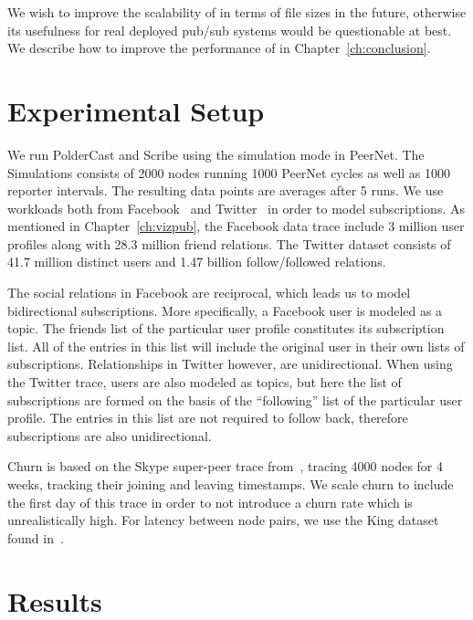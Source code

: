 We wish to improve the scalability of \demo{} in terms of file sizes in
the future, otherwise its usefulness for real deployed pub/sub systems
would be questionable at best. We describe how to improve the
performance of \demo{} in Chapter~\ref{ch:conclusion}.

\section{Experimental Setup}

We run PolderCast and Scribe using the simulation mode in PeerNet. The
Simulations consists of 2000 nodes running 1000 PeerNet cycles as well
as 1000 reporter intervals. The resulting data points are averages after 5
runs. We use workloads both from Facebook~\cite{facebook-eurosys09} and
Twitter~\cite{Kwak10www} in order to model subscriptions. As mentioned
in Chapter~\ref{ch:vizpub}, the Facebook data trace include 3 million
user profiles along with 28.3 million friend relations. The Twitter
dataset consists of 41.7 million distinct users and 1.47 billion
follow/followed relations.

The social relations in Facebook are reciprocal, which leads us to model
bidirectional subscriptions. More specifically, a Facebook user is
modeled as a topic. The friends list of the particular user profile
constitutes its subscription list. All of the entries in this list will
include the original user in their own lists of subscriptions.
Relationships in Twitter however, are unidirectional. When using the
Twitter trace, users are also modeled as topics, but here the list of
subscriptions are formed on the basis of the ``following'' list of the
particular  user profile. The entries in this list are not required to
follow back, therefore subscriptions are also unidirectional.

Churn is based on the Skype super-peer trace from~\cite{Guha:2006}, tracing 4000
nodes for 4 weeks, tracking their joining and leaving timestamps. We
scale churn to include the first day of this trace in order to not
introduce a churn rate which is unrealistically high. For latency
between node pairs, we use the King dataset found in~\cite{king}.

\section{Results}


